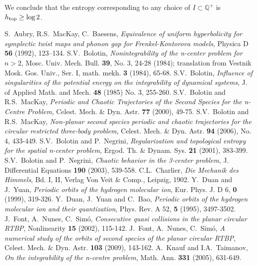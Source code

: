\documentclass[a4paper]{article}
\begin{document}
\begin{footnotesize}
We conclude that the entropy corresponding to any choice of $I \subset
{\mathbb{Q}}^+$ is $h_{\rm top} \geq \log 2$.

 

\begin{thebibliography}{10}
 S.~Aubry, R.S.~MacKay, C.~Baesens, \emph{Equivalence of
  uniform hyperbolicity for symplectic twist maps and phonon gap for
  Frenkel-Kontorova models}, Physica D \textbf{56} (1992), 123--134.
 S.V.~Bolotin, \emph{Nonintegrability of the n-center
  problem for $n > 2$}, Mosc. Univ. Mech. Bull. \textbf{39}, No. 3,
  24-28 (1984); translation from Vestnik Mosk. Gos. Univ., Ser. I,
  math. mekh. \textbf{3} (1984), 65-68.
 S.V.~Bolotin, \emph{Influence of singularities of the
  potential energy on the integrability of dynamical systems}, J. of
  Applied Math. and Mech.  \textbf{48} (1985) No. 3, 255-260.
 S.V.~Bolotin and R.S.~MacKay, \emph{Periodic and Chaotic
  Trajectories of the Second Species for the n-Centre Problem},
  Celest. Mech. \& Dyn. Astr.  \textbf{77} (2000), 49-75.
 S.V.~Bolotin and R.S.~MacKay, \emph{Non-planar second
  species periodic and chaotic trajectories for the circular
  restricted three-body problem}, Celest. Mech. \&
  Dyn. Astr. \textbf{94} (2006), No. 4, 433-449.
 S.V.~Bolotin and P.~Negrini, \emph{Regularization and
  topological entropy for the spatial n-center problem}, Ergod. Th. \&
  Dynam. Sys. \textbf{21} (2001), 383-399.
 S.V.~Bolotin and P.~Negrini, \emph{Chaotic behavior in
  the 3-center problem}, J. Differential Equations \textbf{190}
  (2003), 539-558.
 C.L.~Charlier, \emph{Die Mechanik des Himmels}, Bd. I,
  II, Verlag Von Veit \& Comp., Leipzig, 1902.
 Y.~Duan and J.~Yuan, \emph{Periodic orbits of the
  hydrogen molecular ion}, Eur. Phys. J. D 6, \textbf{0} (1999),
  319-326.
 Y.~Duan, J.~Yuan and C.~Bao, \emph{Periodic orbits of
  the hydrogen molecular ion and their quantization}, Phys. Rev. A 52,
  \textbf{5} (1995), 3497-3502.
 J.~Font, A.~Nunes, C.~Sim\'o, \emph{Consecutive quasi
  collisions in the planar circular RTBP}, Nonlinearity \textbf{15}
  (2002), 115-142.
 J.~Font, A.~Nunes, C.~Sim\'o, \emph{A numerical study
  of the orbits of second species of the planar circular RTBP},
  Celest. Mech. \& Dyn. Astr.  \textbf{103} (2009), 143-162.
 A.~Knauf and I.A.~Taimanov, \emph{On the integrability of
  the n-centre problem}, Math. Ann. \textbf{331} (2005), 631-649.
\end{thebibliography}

\end{footnotesize}
\end{document}
